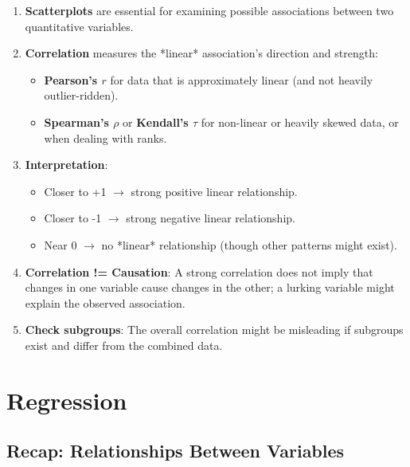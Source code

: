 \documentclass[10pt]{extarticle}
\begin{document}
\begin{takeaway-box}{}{}
\begin{enumerate}
    \item \textbf{Scatterplots} are essential for examining possible associations between two quantitative variables.
    \item \textbf{Correlation} measures the *linear* association's direction and strength:
          \begin{itemize}
              \item \textbf{Pearson's $r$} for data that is approximately linear (and not heavily outlier-ridden).
              \item \textbf{Spearman's $\rho$} or \textbf{Kendall's $\tau$} for non-linear or heavily skewed data, or when dealing with ranks.
          \end{itemize}
    \item \textbf{Interpretation}:
          \begin{itemize}
              \item Closer to +1 $\rightarrow$ strong positive linear relationship.
              \item Closer to -1 $\rightarrow$ strong negative linear relationship.
              \item Near 0 $\rightarrow$ no *linear* relationship (though other patterns might exist).
          \end{itemize}
    \item \textbf{Correlation != Causation}: A strong correlation does not imply that changes in one variable cause changes in the other; a lurking variable might explain the observed association.
    \item \textbf{Check subgroups}: The overall correlation might be misleading if subgroups exist and differ from the combined data.
\end{enumerate}
\end{takeaway-box}

\section{Regression}
\subsection{Recap: Relationships Between Variables}
\end{document}
